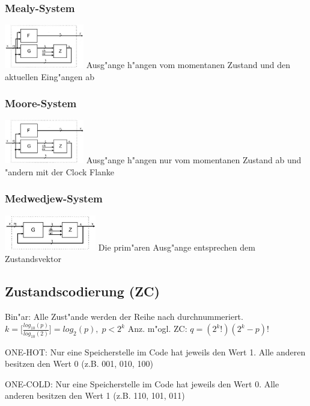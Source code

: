	\begin{multicols}{3}
		\subsubsection{Mealy-System}
			\includegraphics[width=0.26\textwidth]{pics/seq_mealy}
			Ausg"ange h"angen vom momentanen Zustand und den aktuellen Eing"angen ab
			
		\subsubsection{Moore-System}
			\includegraphics[width=0.26\textwidth]{pics/seq_moore}
			Ausg"ange h"angen nur vom momentanen Zustand ab und "andern mit der Clock Flanke
			
		\subsubsection{Medwedjew-System}
			\includegraphics[width=0.3\textwidth]{pics/seq_medmedjew}
			Die prim"aren Ausg"ange entsprechen dem Zustandsvektor
	\end{multicols}
	
\subsection{Zustandscodierung (ZC)}
	\begin{multicols}{3}
		\begin{compactitem}
			\item Bin"ar: Alle Zust"ande werden der Reihe nach durchnummeriert.
			$k = \lbrack \frac{log_{10}(p)}{log_{10}(2)} \rbrack = log_2(p), \; p < 2^k $
			Anz. m"ogl. ZC: $q = (2^k!)(2^k - p)!$
			\item ONE-HOT: Nur eine Speicherstelle im Code hat jeweils den Wert 1. Alle anderen besitzen den Wert 0 (z.B. 001, 010, 100)
			\item ONE-COLD: Nur eine Speicherstelle im Code hat jeweils den Wert 0. Alle anderen besitzen den Wert 1 (z.B. 110, 101, 011)
		\end{compactitem}
	\end{multicols}
\newpage
